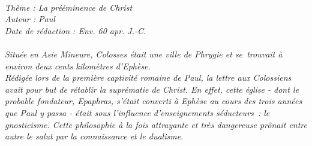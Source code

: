 \BFont
\noindent\hrulefill
\textit{
\bigskip
{\centering{}
\\Thème : La prééminence de Christ
\\Auteur : Paul
\\Date de rédaction : Env. 60 apr. J.-C.\\}
}
\textit{
\\Située en Asie Mineure, Colosses était une ville de Phrygie et se trouvait à environ deux cents kilomètres d’Ephèse.
\bigskip
\\Rédigée lors de la première captivité romaine de Paul, la lettre aux Colossiens avait pour but de rétablir la suprématie de Christ. En effet, cette église - dont le probable fondateur, Epaphras, s’était converti à Ephèse au cours des trois années que Paul y passa - était sous l’influence d’enseignements séducteurs : le gnosticisme. Cette philosophie à la fois attrayante et très dangereuse prônait entre autre le salut par la connaissance et le dualisme.\bigskip
}
\par\nobreak\noindent\hrulefill
